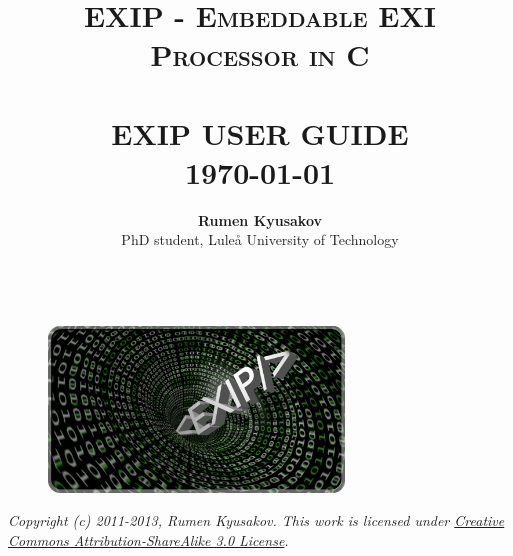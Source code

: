 \documentclass[paper=a4, fontsize=11pt]{scrartcl}	%
\title{	\normalsize \textsc{EXIP - Embeddable EXI Processor in C} 	%
		 	\\[2.0cm]													%
			\HRule{0.5pt} \\										%
			\LARGE \textbf{\uppercase{EXIP User Guide}}	%
			\HRule{2pt} \\ [0.5cm]								%
			\normalsize \today									%
		}
\author{
		\textbf{Rumen Kyusakov}\\	
		PhD student, Lule{\aa} University of Technology\\ [0.5cm]
		\HRule{0.5pt} \\ [0.5cm]
}
\makeatletter
\numberwithin{equation}{section}															%
\numberwithin{figure}{section}																%
\numberwithin{table}{section}																%
\def\printtitle{%
    {\centering \@title\par}}
\def\printauthor{%
    {\centering \large \@author}}
\makeatother
\begin{document}
\thispagestyle{empty}				%

\printtitle									%
  	\vfill
\begin{figure}[!h]
 \begin{center}
 \includegraphics[width=0.70\textwidth, keepaspectratio=true]{images/logo.pdf} \\ [3.5cm]
\end{center}
\end{figure} 

\printauthor

\textit{Copyright (c) 2011-2013, Rumen Kyusakov. This work is licensed under \href{http://creativecommons.org/licenses/by-sa/3.0/}{Creative Commons Attribution-ShareAlike 3.0 License}.}

\clearpage

\thispagestyle{empty}				%

\tableofcontents

\clearpage

\setcounter{page}{1}

















\end{document}
